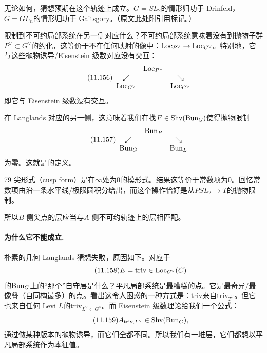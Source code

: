无论如何，猜想预期在这个轨迹上成立。$G=SL_2$的情形归功于 Drinfeld，$G=GL_n$的情形归功于 Gaitsgory。（原文此处附引用标记。）

限制到不可约局部系统在另一侧对应什么？不可约局部系统意味着没有到抛物子群$P^{\vee}\subset G^{\vee}$的约化，这等价于不在任何映射的像中：$\mathrm{Loc}_{P^{\vee}}\to\mathrm{Loc}_{G^{\vee}}$。特别地，它与这些抛物诱导/Eisenstein 级数对应没有交互：
\begin{equation}\tag{11.156}
\begin{array}{ccc}
 & \mathrm{Loc}_{P^{\vee}} & \\
 \swarrow & & \searrow\\
 \mathrm{Loc}_{G^{\vee}} & & \mathrm{Loc}_{G^{\vee}}
\end{array}
\end{equation}
即它与 Eisenstein 级数没有交互。

在 Langlands 对应的另一侧，这意味着我们在找$F\in\mathrm{Shv}(\mathrm{Bun}_G)$使得抛物限制
\begin{equation}\tag{11.157}
\begin{array}{ccc}
 & \mathrm{Bun}_P & \\
 \swarrow & & \searrow\\
 \mathrm{Bun}_G & & \mathrm{Bun}_L
\end{array}
\end{equation}
为零。这就是的定义。

\begin{srcex}{79}
尖形式（cusp form）是在$\infty$处为$0$的模形式。结果这等价于常数项为$0$。回忆常数项由沿一条水平线/极限圆积分给出，而这个操作恰好是从$PSL_2\to T$的抛物限制。
\end{srcex}
所以$B$-侧尖点的层应当与$A$-侧不可约轨迹上的层相匹配。

\paragraph{为什么它不能成立.}
朴素的几何 Langlands 猜想失败，原因如下。对应于
\begin{equation}\tag{11.158}
E=\mathrm{triv}\in\mathrm{Loc}_{G^{\vee}}(C)
\end{equation}
的$\mathrm{Bun}_G$上的“那个”自守层是什么？平凡局部系统是最糟糕的点。它是最奇异/最像叠（自同构最多）的点。看出这令人困惑的一种方式是：$\mathrm{triv}$来自$\mathrm{triv}_{T^{\vee}}$。但它也来自任何 Levi $L$的$\mathrm{triv}_{L^{\vee}\subset G^{\vee}}$。而 Eisenstein 级数理论给我们一个公式：
\begin{equation}\tag{11.159}
A_{\mathrm{triv},L^{\vee}}\in\mathrm{Shv}(\mathrm{Bun}_G),
\end{equation}
通过做某种版本的抛物诱导，而它们全都不同。所以我们有一堆层，它们都想以平凡局部系统作为本征值。

